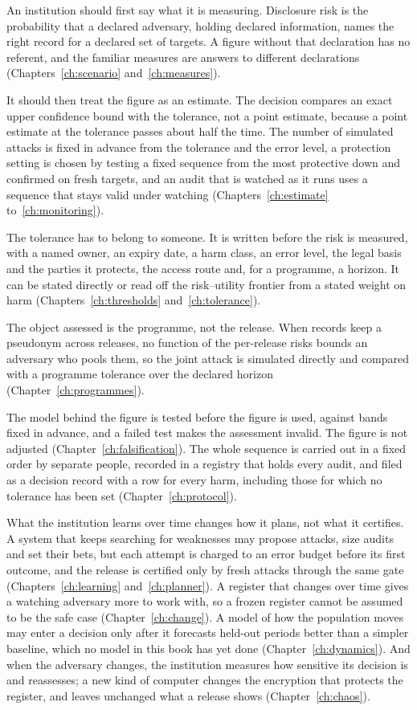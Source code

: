 An institution should first say what it is measuring. Disclosure risk is the
probability that a declared adversary, holding declared information, names the right
record for a declared set of targets. A figure without that declaration has no
referent, and the familiar measures are answers to different declarations
(Chapters~\ref{ch:scenario} and~\ref{ch:measures}).

It should then treat the figure as an estimate. The decision compares an exact upper
confidence bound with the tolerance, not a point estimate, because a point estimate at
the tolerance passes about half the time. The number of simulated attacks is fixed in
advance from the tolerance and the error level, a protection setting is chosen by
testing a fixed sequence from the most protective down and confirmed on fresh
targets, and an audit that is watched as it runs uses a sequence that stays valid
under watching (Chapters~\ref{ch:estimate} to~\ref{ch:monitoring}).

The tolerance has to belong to someone. It is written before the risk is measured,
with a named owner, an expiry date, a harm class, an error level, the legal basis and
the parties it protects, the access route and, for a programme, a horizon. It can be
stated directly or read off the risk--utility frontier from a stated weight on harm
(Chapters~\ref{ch:thresholds} and~\ref{ch:tolerance}).

The object assessed is the programme, not the release. When records keep a pseudonym
across releases, no function of the per-release risks bounds an adversary who pools
them, so the joint attack is simulated directly and compared with a programme
tolerance over the declared horizon (Chapter~\ref{ch:programmes}).

The model behind the figure is tested before the figure is used, against bands fixed
in advance, and a failed test makes the assessment invalid. The figure is not adjusted
(Chapter~\ref{ch:falsification}). The whole sequence is carried out in a fixed order
by separate people, recorded in a registry that holds every audit, and filed as a
decision record with a row for every harm, including those for which no tolerance has
been set (Chapter~\ref{ch:protocol}).

What the institution learns over time changes how it plans, not what it certifies. A
system that keeps searching for weaknesses may propose attacks, size audits and set their
bets, but each attempt is charged to an error budget before its first outcome, and the
release is certified only by fresh attacks through the same gate (Chapters~\ref{ch:learning}
and~\ref{ch:planner}). A register that changes over time gives a watching adversary more to
work with, so a frozen register cannot be assumed to be the safe case
(Chapter~\ref{ch:change}). A model of how the population moves may enter a decision only
after it forecasts held-out periods better than a simpler baseline, which no model in this
book has yet done (Chapter~\ref{ch:dynamics}). And when the adversary changes, the
institution measures how sensitive its decision is and reassesses; a new kind of computer
changes the encryption that protects the register, and leaves unchanged what a release
shows (Chapter~\ref{ch:chaos}).

